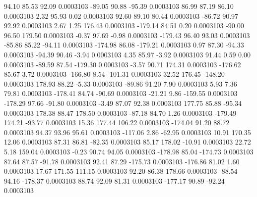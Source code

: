        94.10       85.53       92.09     0.0003103
      -89.05       90.88      -95.39     0.0003103
       86.99       87.19       86.10     0.0003103
        2.32       95.93        0.02     0.0003103
       92.60       89.10       80.44     0.0003103
      -86.72       90.97       92.92     0.0003103
        2.67        1.25      176.43     0.0003103
     -179.14       84.51        0.20     0.0003103
      -90.00       96.50      179.50     0.0003103
       -0.37       97.69       -0.98     0.0003103
     -179.43       96.40       93.03     0.0003103
      -85.86       85.22      -94.11     0.0003103
     -174.98       86.08     -179.21     0.0003103
        0.97       87.30      -94.33     0.0003103
      -94.39       90.46       -3.94     0.0003103
        4.35       85.97       -3.92     0.0003103
       91.44        0.59        0.00     0.0003103
      -89.59       87.54     -179.30     0.0003103
       -3.57       90.71      174.31     0.0003103
     -176.62       85.67        3.72     0.0003103
     -166.80        8.54     -101.31     0.0003103
       32.52      176.45     -148.20     0.0003103
      178.93       88.22       -5.33     0.0003103
      -89.86       91.20        7.90     0.0003103
        5.93        7.36       79.81     0.0003103
     -178.41       84.74      -90.69     0.0003103
      -21.21        9.86     -159.55     0.0003103
     -178.29       97.66      -91.80     0.0003103
       -3.49       87.07       92.38     0.0003103
      177.75       85.88      -95.34     0.0003103
      178.38       88.47      178.50     0.0003103
      -87.18       84.70        1.26     0.0003103
     -179.49      174.21      -93.77     0.0003103
       15.36      177.44      106.22     0.0003103
     -174.04       91.20       88.72     0.0003103
       94.37       93.96       95.61     0.0003103
     -117.06        2.86      -62.95     0.0003103
       10.91      170.35       12.06     0.0003103
       87.31       86.81      -82.35     0.0003103
       85.17      178.02      -10.91     0.0003103
       22.72        5.18      159.04     0.0003103
       -0.23       90.74       94.05     0.0003103
     -178.98       85.04     -174.73     0.0003103
       87.64       87.57      -91.78     0.0003103
       92.41       87.29     -175.73     0.0003103
     -176.86       81.02        1.60     0.0003103
       17.67      171.55      111.15     0.0003103
       92.20       86.38      178.66     0.0003103
      -88.54       94.16     -178.37     0.0003103
       88.74       92.09       81.31     0.0003103
     -177.17       90.89      -92.24     0.0003103
